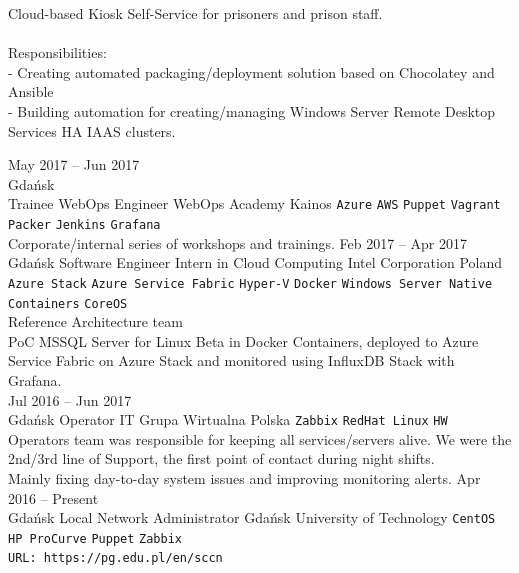 \documentclass[9pt]{style/developercv}
\begin{document}
\begin{entrylist}
{      Cloud-based Kiosk Self-Service for prisoners and prison staff. \\
      \\
      Responsibilities:\\
      - Creating automated packaging/deployment solution based on Chocolatey and Ansible\\
      - Building automation for creating/managing Windows Server Remote Desktop Services HA IAAS clusters.

		}
	\entry
    {May 2017 -- Jun 2017\\\footnotesize{Gdańsk}\\
    \footnotesize{Trainee WebOps Engineer}}
		{WebOps Academy}
		{Kainos}
		{
			\texttt{Azure}\slashsep
			\texttt{AWS}\slashsep
			\texttt{Puppet}\slashsep
			\texttt{Vagrant}\slashsep
			\texttt{Packer}\slashsep
			\texttt{Jenkins}\slashsep
			\texttt{Grafana}\\

      Corporate/internal series of workshops and trainings.
		}
	\entry
		{Feb 2017 -- Apr 2017\\\footnotesize{Gdańsk}}
		{Software Engineer Intern in Cloud Computing}
		{Intel Corporation Poland}
		{
      \texttt{Azure Stack}\slashsep
      \texttt{Azure Service Fabric}\slashsep
      \texttt{Hyper-V}\slashsep
      \texttt{Docker}\slashsep
			\texttt{Windows Server Native Containers}\slashsep
			\texttt{CoreOS}\\

      Reference Architecture team\\
      PoC MSSQL Server for Linux Beta in Docker Containers, deployed to Azure Service Fabric on Azure Stack and
      monitored using InfluxDB Stack with Grafana. \\
		}
	\entry
    {Jul 2016 -- Jun 2017\\\footnotesize{Gdańsk}}
		{Operator IT}
		{Grupa Wirtualna Polska}
		{
			\texttt{Zabbix}\slashsep
			\texttt{RedHat Linux}\slashsep
			\texttt{HW}\\

      Operators team was responsible for keeping all services/servers alive.
      We were the 2nd/3rd line of Support, the first point of contact during night shifts.\\
      Mainly fixing day-to-day system issues and improving monitoring alerts.
		}
	\entry
    {Apr 2016 -- Present\\\footnotesize{Gdańsk}}
    {Local Network Administrator}
    {Gdańsk University of Technology}
		{
			\texttt{CentOS}\slashsep
			\texttt{HP ProCurve}\slashsep
			\texttt{Puppet}\slashsep
			\texttt{Zabbix}\\
      \texttt{URL: https://pg.edu.pl/en/sccn}\\

}
\end{entrylist}
\end{document}
